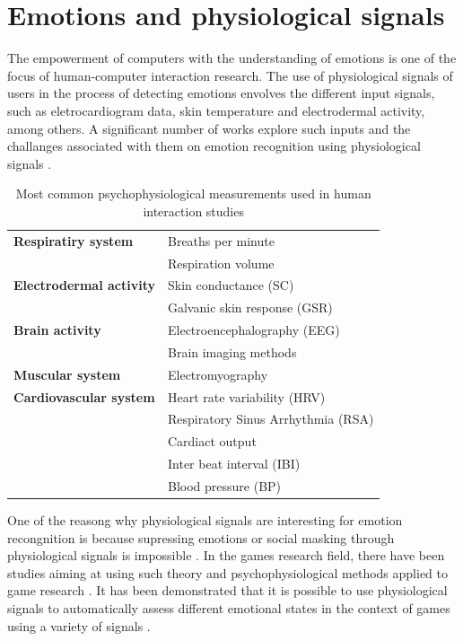 \chapter{Emotions and physiological signals}
\label{ch:literature-physiological}

The empowerment of computers with the understanding of emotions is one of the focus of human-computer interaction research. The use of physiological signals of users in the process of detecting emotions envolves the different input signals, such as eletrocardiogram data, skin temperature and electrodermal activity, among others. A significant number of works explore such inputs and the challanges associated with them on emotion recognition using physiological signals \parencite{jerritta2011physiological}.


\begin{table}[h]
\caption{Most common psychophysiological measurements used in human interaction studies \parencite{jerritta2011physiological}}
\label{table:physiological-signals}
\begin{tabular}{L{.4\linewidth}L{.5\linewidth}}%
\toprule%
\textbf{Respiratiry system} & Breaths per minute\\
 & Respiration volume \\
\midrule
 \textbf{Electrodermal activity} & Skin conductance (SC) \\
 & Galvanic skin response (GSR) \\
\midrule
\textbf{Brain activity} & Electroencephalography (EEG) \\
& Brain imaging methods \\
\midrule
\textbf{Muscular system} & Electromyography \\
\midrule
\textbf{Cardiovascular system} & Heart rate variability (HRV) \\
& Respiratory Sinus Arrhythmia (RSA)  \\
& Cardiact output  \\
& Inter beat interval (IBI) \\
& Blood pressure (BP)  \\
\bottomrule%
\end{tabular}%
\end{table}

One of the reasong why physiological signals are interesting for emotion recongnition is because supressing emotions or social masking through physiological signals is impossible \parencite{kim2004emotion}. In the games research field, there have been studies aiming at using such theory and psychophysiological methods applied to game research \parencite{kivikangas2011review}. It has been demonstrated that it is possible to use physiological signals to automatically assess different emotional states in the context of games using a variety of signals \parencite{bousefsaf2013remote,yun2009game,rani2006empirical,tijs2008dynamic}.

